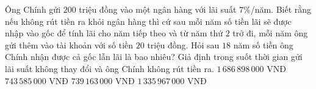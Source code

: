 \begin{ex}%
	 Ông Chính gửi $200$ triệu đồng vào một ngân hàng với lãi suất $7\%$/năm. Biết rằng nếu không rút tiền ra khỏi ngân hàng thì cứ sau mỗi năm số tiền lãi sẽ được nhập vào gốc để tính lãi cho năm tiếp theo và từ năm thứ $2$ trở đi, mỗi năm ông gửi thêm vào tài khoản với số tiền $20$ triệu đồng. Hỏi sau $18$ năm số tiền ông Chính nhận được cả gốc lẫn lãi là bao nhiêu? Giả định trong suốt thời gian gửi lãi suất không thay đổi và ông Chính không rút tiền ra.
	\choice 
		{$1\,686\,898\,000$ VNĐ} 
		 {$743\,585\,000$ VNĐ}
		{$739\,163\,000$ VNĐ} 
		{\True $1\,335\,967\,000$ VNĐ} 
\end{ex}


